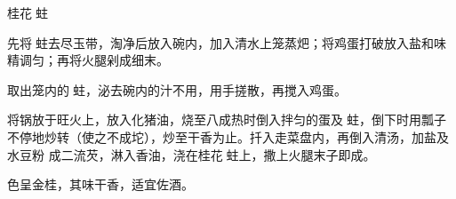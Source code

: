 \begin{recipe}{桂花𧎼蛀}

\ingredients


\preparation

\step 先将𧎼蛀去尽玉带，淘净后放入碗内，加入清水上笼蒸𤆵；将鸡蛋打破放入盐和味
精调匀；再将火腿剁成细末。

\step 取出笼内的𧎼蛀，泌去碗内的汁不用，用手搓散，再搅入鸡蛋。

\step 将锅放于旺火上，放入化猪油，烧至八成热时倒入拌匀的蛋及𧎼蛀，倒下时用瓢子
不停地炒转（使之不成坨），炒至干香为止。扦入走菜盘内，再倒入清汤，加盐及水豆粉
成二流芡，淋入香油，浇在桂花𧎼蛀上，撒上火腿末子即成。

\features

色呈金桂，其味干香，适宜佐酒。

\end{recipe}

